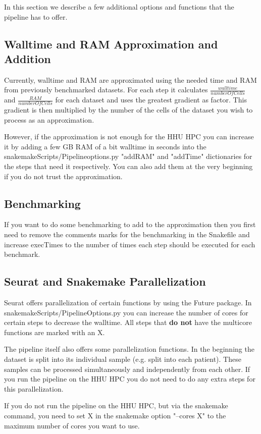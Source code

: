 In this section we describe a few additional options and functions that the pipeline has to offer.

\subsection{Walltime and RAM Approximation and Addition}
Currently, walltime and RAM are approximated using the needed time and RAM from previously benchmarked datasets. For each step it calculates $\frac{walltime}{numberOfCells}$ and $\frac{RAM}{numberOfCells}$ for each dataset and uses the greatest gradient as factor. This gradient is then multiplied by the number of the cells of the dataset you wish to process as an approximation. 

However, if the approximation is not enough for the HHU HPC you can increase it by adding a few GB RAM of a bit walltime in seconds into the snakemakeScripts/Pipelineoptions.py "addRAM" and "addTime" dictionaries for the steps that need it respectively. You can also add them at the very beginning if you do not trust the approximation.

\subsection{Benchmarking}
If you want to do some benchmarking to add to the approximation then you first need to remove the comments marks for the benchmarking in the Snakefile and increase execTimes to the number of times each step should be executed for each benchmark.

\subsection{Seurat and Snakemake Parallelization}
Seurat offers parallelization of certain functions by using the Future package. In snakemakeScripts/PipelineOptions.py you can increase the number of cores for certain steps to decrease the walltime. All steps that \textbf{do not} have the multicore functions are marked with an X.

The pipeline itself also offers some parallelization functions. In the beginning the dataset is split into its individual sample (e.g. split into each patient). These samples can be processed simultaneously and independently from each other. If you run the pipeline on the HHU HPC you do not need to do any extra steps for this parallelization.

If you do not run the pipeline on the HHU HPC, but via the snakemake command, you need to set X in the snakemake option "--cores X" to the maximum number of cores you want to use.

